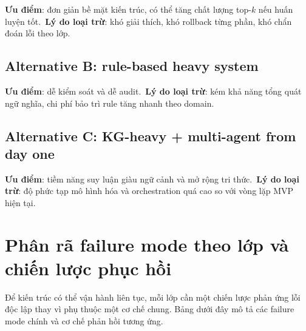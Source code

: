 \textbf{Ưu điểm}: đơn giản bề mặt kiến trúc, có thể tăng chất lượng top-$k$ nếu huấn luyện tốt.\
\textbf{Lý do loại trừ}: khó giải thích, khó rollback từng phần, khó chẩn đoán lỗi theo lớp.

\subsection{Alternative B: rule-based heavy system}

\textbf{Ưu điểm}: dễ kiểm soát và dễ audit.\
\textbf{Lý do loại trừ}: kém khả năng tổng quát ngữ nghĩa, chi phí bảo trì rule tăng nhanh theo domain.

\subsection{Alternative C: KG-heavy + multi-agent from day one}

\textbf{Ưu điểm}: tiềm năng suy luận giàu ngữ cảnh và mở rộng tri thức.\
\textbf{Lý do loại trừ}: độ phức tạp mô hình hóa và orchestration quá cao so với vòng lặp MVP hiện tại.

\section{Phân rã failure mode theo lớp và chiến lược phục hồi}

Để kiến trúc có thể vận hành liên tục, mỗi lớp cần một chiến lược phản ứng lỗi độc lập thay vì phụ thuộc một cơ chế chung. Bảng dưới đây mô tả các failure mode chính và cơ chế phản hồi tương ứng.

